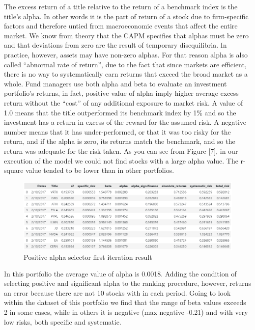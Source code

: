 \documentclass[twocolumn]{article}
\begin{document}
The excess return of a title relative to the return of a benchmark index is the title’s alpha. In other words it is the part of return of a stock due to firm-specific factors and therefore untied from macroeconomic events that affect the entire market. We know from theory that the CAPM specifies that alphas must be zero and that deviations from zero are the result of temporary disequilibria. In practice, however, assets may have non-zero alphas. For that reason alpha is also called “abnormal rate of return”, due to the fact that since markets are efficient, there is no way to systematically earn returns that exceed the broad market as a whole. Fund managers use both alpha and beta to evaluate an investment portfolio’s returns, in fact, positive value of alpha imply higher average excess return without the “cost” of any additional exposure to market risk. A value of 1.0 means that the title outperformed its benchmark index by 1\% and so the investment has a return in excess of the reward for the assumed risk. A negative number means that it has under-performed, or that it was too risky for the return, and if the alpha is zero, its returns match the benchmark, and so the return was adequate for the risk taken. As you can see from Figure [7], in our execution of the model we could not find stocks with a large alpha value.  The r-square value tended to be lower than in other portfolios.
\begin{figure}[t]
\centering\includegraphics[scale=0.5]{positive_alpha.png}
\caption{Positive alpha selector first iteration result}
\end{figure}
In this portfolio the average value of alpha is 0.0018. Adding the condition of selecting positive and significant alpha to the ranking procedure, however, returns an error because there are not 10 stocks with  in each period. 
Going to look within the dataset of this portfolio we find that the range of beta values exceeds 2 in some cases, while in others it is negative (max negative -0.21) and with very low risks, both specific and systematic.
\end{document}
